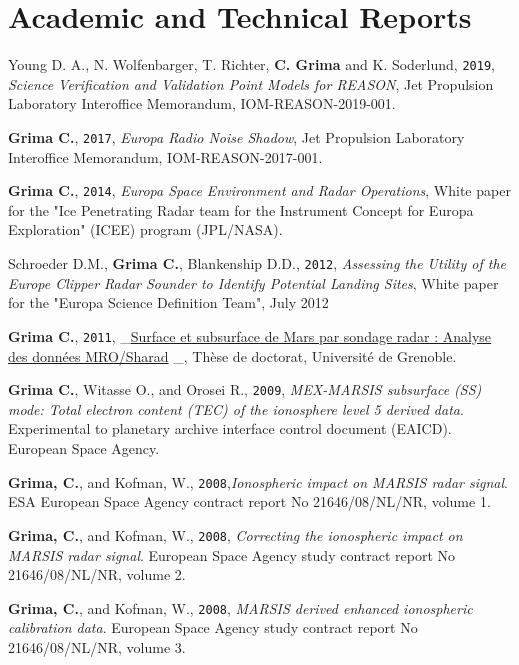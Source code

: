 \section*{Academic and Technical Reports}

\begin{etaremune}
\def\labelenumi{\arabic{enumi}.}
\item
   Young D. A., N. Wolfenbarger, T. Richter, \textbf{C. Grima} and K. Soderlund, \texttt{2019}, \emph{Science Verification and Validation Point Models for REASON}, Jet Propulsion Laboratory Interoffice Memorandum, IOM-REASON-2019-001.
\item
  \textbf{Grima C.}, \texttt{2017}, \emph{Europa Radio Noise Shadow},
  Jet Propulsion Laboratory Interoffice Memorandum, IOM-REASON-2017-001.
\item
  \textbf{Grima C.}, \texttt{2014}, \emph{Europa Space Environment and
  Radar Operations}, White paper for the "Ice Penetrating Radar team for
  the Instrument Concept for Europa Exploration" (ICEE) program
  (JPL/NASA).
\item
  Schroeder D.M., \textbf{Grima C.}, Blankenship D.D., \texttt{2012},
  \emph{Assessing the Utility of the Europe Clipper Radar Sounder to
  Identify Potential Landing Sites}, White paper for the "Europa Science
  Definition Team", July 2012
\item
  \textbf{Grima C.}, \texttt{2011},
  \_\href{https://www.google.com/url?sa=t\&rct=j\&q=\&esrc=s\&source=web\&cd=2\&ved=0ahUKEwiu-Jn8t7LPAhWEOSYKHQOlBeUQFggrMAE\&url=http\%3A\%2F\%2Fwww.theses.fr\%2F2011GRENU004.pdf\&usg=AFQjCNFcVxpOJiku0pWYrUsHbDrZU01hiA\&sig2=RAzQ2GJJIpOr1U3PEjRsXw}{Surface
  et subsurface de Mars par sondage radar : Analyse des données
  MRO/Sharad} \_, Thèse de doctorat, Université de Grenoble.
\item
  \textbf{Grima C.}, Witasse O., and Orosei R., \texttt{2009},
  \emph{MEX-MARSIS subsurface (SS) mode: Total electron content (TEC) of
  the ionosphere level 5 derived data}. Experimental to planetary
  archive interface control document (EAICD). European Space Agency.
\item
  \textbf{Grima, C.}, and Kofman, W., \texttt{2008},\emph{Ionospheric
  impact on MARSIS radar signal}. ESA European Space Agency contract
  report No 21646/08/NL/NR, volume 1.
\item
  \textbf{Grima, C.}, and Kofman, W., \texttt{2008}, \emph{Correcting
  the ionospheric impact on MARSIS radar signal}. European Space Agency
  study contract report No 21646/08/NL/NR, volume 2.
\item
  \textbf{Grima, C.}, and Kofman, W., \texttt{2008}, \emph{MARSIS
  derived enhanced ionospheric calibration data}. European Space Agency
  study contract report No 21646/08/NL/NR, volume 3.
\end{etaremune}
